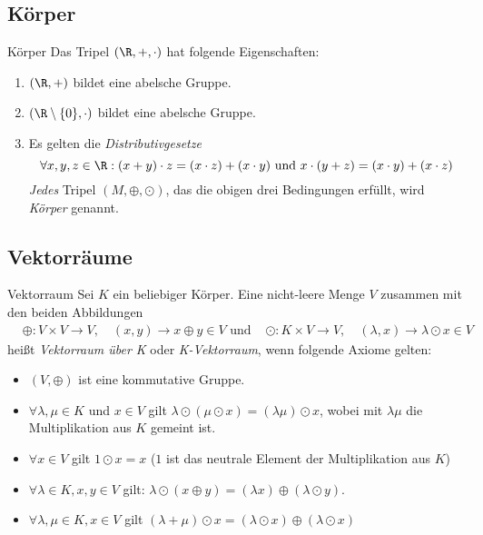 \documentclass[german]{../spicker}
\begin{document}
\subsection{Körper}
\begin{defi}{Körper}
    Das Tripel $(\R, +, \cdot)$ hat folgende Eigenschaften:
    \begin{enumerate}
        \item $(\R, +)$ bildet eine abelsche Gruppe.
        \item $(\R \setminus \{0\}, \cdot)$ bildet eine abelsche Gruppe.
        \item Es gelten die \emph{Distributivgesetze}
              $$
                  \forall x, y, z \in \R : (x+y) \cdot z = (x\cdot z) + (x \cdot y) \text{ und } x \cdot (y + z) = (x \cdot y) + (x \cdot z)
              $$
              \emph{Jedes} Tripel $(M, \oplus, \odot)$, das die obigen drei Bedingungen erfüllt, wird \emph{Körper} genannt.
    \end{enumerate}
\end{defi}

\newpage
\subsection{Vektorräume}
\begin{defi}{Vektorraum}
    Sei $K$ ein beliebiger Körper.
    Eine nicht-leere Menge $V$ zusammen mit den beiden Abbildungen
    $$
        \begin{aligned}
                         & \oplus : V \times V \to V, \quad (x, y) \to x \oplus y \in V
            \text{ und } & \odot : K \times V \to V, \quad (\lambda, x) \to \lambda \odot x \in V
        \end{aligned}
    $$
    heißt \emph{Vektorraum über K} oder \emph{K-Vektorraum}, wenn folgende Axiome gelten:
    \begin{itemize}
        \item $(V, \oplus)$ ist eine kommutative Gruppe.
        \item $\forall \lambda, \mu \in K$ und $x \in V$ gilt $\lambda \odot (\mu \odot x) = (\lambda\mu) \odot x$, wobei mit $\lambda\mu$ die Multiplikation aus $K$ gemeint ist.
        \item $\forall x \in V$ gilt $1 \odot x = x$ ($1$ ist das neutrale Element der Multiplikation aus $K$)
        \item $\forall \lambda \in K, x, y \in V$ gilt: $\lambda \odot (x \oplus y) = (\lambda x) \oplus (\lambda \odot y)$.
        \item $\forall \lambda, \mu \in K, x \in V$ gilt $(\lambda + \mu) \odot x = (\lambda \odot x) \oplus (\lambda \odot x)$
    \end{itemize}
\end{defi}
\end{document}
